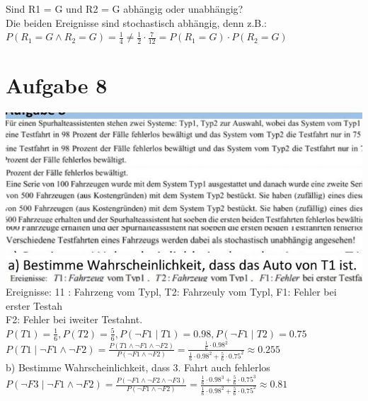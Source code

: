 \documentclass[10pt]{article}
\begin{document}
{Sind R1 = G und R2 = G abhängig oder unabhängig?\\
Die beiden Ereignisse sind stochastisch abhängig, denn z.B.:\\
$P\left(R_{1}=G \wedge R_{2}=G\right)=\frac{1}{4} \neq \frac{1}{2} \cdot \frac{7}{12}=P\left(R_{1}=G\right) \cdot P\left(R_{2}=G\right)$

\section*{Aufgabe 8}
\includegraphics[width=\linewidth]{images/2024_12_29_0906b02acf849bda8665g-5(9)}\\
\includegraphics[width=\linewidth]{images/2024_12_29_0906b02acf849bda8665g-5(8)}\\
\includegraphics[width=\linewidth]{images/2024_12_29_0906b02acf849bda8665g-5(3)}\\
\includegraphics[width=\linewidth]{images/2024_12_29_0906b02acf849bda8665g-5(6)}\\
\includegraphics[width=\linewidth]{images/2024_12_29_0906b02acf849bda8665g-5(5)}\\
\includegraphics[width=\linewidth]{images/2024_12_29_0906b02acf849bda8665g-5(1)} Ereignisse: 11 : Fahrzeng vom Typl, T2: Fahrzeuly vom Typl, F1: Fehler bei erster Testah\\
F2: Fehler bei iweiter Testahnt.\\
$P(T 1)=\frac{1}{6}, P(T 2)=\frac{5}{6}, P(\neg F 1 \mid T 1)=0.98, P(\neg F 1 \mid T 2)=0.75$\\
$P(T 1 \mid \neg F 1 \wedge \neg F 2)=\frac{P(T 1 \wedge \neg F 1 \wedge \neg F 2)}{P(\neg F 1 \wedge \neg F 2)}=\frac{\frac{1}{6} \cdot 0.98^{2}}{\frac{1}{6} \cdot 0.98^{2}+\frac{5}{6} \cdot 0.75^{2}} \approx 0.255$\\
b) Bestimme Wahrscheinlichkeit, dass 3. Fahrt auch fehlerlos\\
$P(\neg F 3 \mid \neg F 1 \wedge \neg F 2)=\frac{P(\neg F 1 \wedge \neg F 2 \wedge \neg F 3)}{P(\neg F 1 \wedge \neg F 2)}=\frac{\frac{1}{6} \cdot 0.98^{3}+\frac{5}{6} \cdot 0.75^{3}}{\frac{1}{6} \cdot 0.98^{2}+\frac{5}{6} \cdot 0.75^{2}} \approx 0.81$

}
\end{document}
